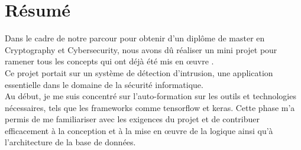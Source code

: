 \documentclass[a4paper,12pt]{report}
\begin{document}
\chapter*{\centering Résumé}
\noindent\large{}
\large Dans le cadre de notre parcour pour obtenir d'un diplôme de master en Cryptography et Cybersecurity, nous avons dû réaliser un mini projet pour ramener tous les concepts qui ont déjà été mis en œuvre .\\[0.5cm]
\large Ce projet portait sur un système de détection d’intrusion, une application essentielle dans le domaine de la sécurité informatique.\\[0.5cm]
\large Au début, je me suis concentré sur l'auto-formation sur les outils et technologies nécessaires, tels que les frameworks comme tensorflow et keras. Cette phase m'a permis de me familiariser avec les exigences du projet et de contribuer efficacement à la conception et à la mise en œuvre de la logique ainsi qu'à l'architecture de la base de données.
\end{document}
